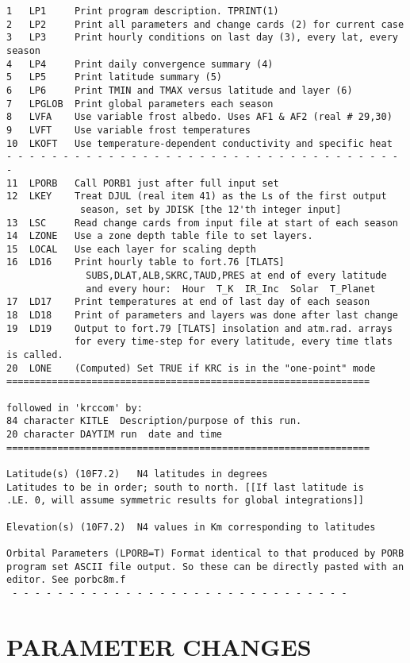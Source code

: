 \documentclass{article}
\begin{document}
\begin{verbatim}
1   LP1     Print program description. TPRINT(1) 
2   LP2     Print all parameters and change cards (2) for current case
3   LP3     Print hourly conditions on last day (3), every lat, every season
4   LP4     Print daily convergence summary (4)
5   LP5     Print latitude summary (5)
6   LP6     Print TMIN and TMAX versus latitude and layer (6)
7   LPGLOB  Print global parameters each season
8   LVFA    Use variable frost albedo. Uses AF1 & AF2 (real # 29,30)
9   LVFT    Use variable frost temperatures
10  LKOFT   Use temperature-dependent conductivity and specific heat
- - - - - - - - - - - - - - - - - - - - - - - - - - - - - - - - - - - - 
11  LPORB   Call PORB1 just after full input set
12  LKEY    Treat DJUL (real item 41) as the Ls of the first output
             season, set by JDISK [the 12'th integer input]
13  LSC     Read change cards from input file at start of each season
14  LZONE   Use a zone depth table file to set layers.
15  LOCAL   Use each layer for scaling depth
16  LD16    Print hourly table to fort.76 [TLATS] 
              SUBS,DLAT,ALB,SKRC,TAUD,PRES at end of every latitude
              and every hour:  Hour  T_K  IR_Inc  Solar  T_Planet
17  LD17    Print temperatures at end of last day of each season
18  LD18    Print of parameters and layers was done after last change
19  LD19    Output to fort.79 [TLATS] insolation and atm.rad. arrays 
            for every time-step for every latitude, every time tlats is called.
20  LONE    (Computed) Set TRUE if KRC is in the "one-point" mode
================================================================

followed in 'krccom' by: 
84 character KITLE	Description/purpose of this run.
20 character DAYTIM	run  date and time
================================================================

Latitude(s) (10F7.2)   N4 latitudes in degrees
Latitudes to be in order; south to north. [[If last latitude is
.LE. 0, will assume symmetric results for global integrations]]

Elevation(s) (10F7.2)  N4 values in Km corresponding to latitudes

Orbital Parameters (LPORB=T) Format identical to that produced by PORB
program set ASCII file output. So these can be directly pasted with an
editor. See porbc8m.f
 - - - - - - - - - - - - - - - - - - - - - - - - - - - - - - 
\end{verbatim}

\section{PARAMETER CHANGES \label{pc}}
\end{document}
